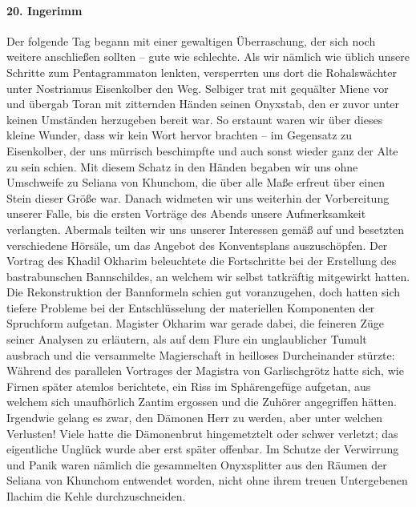 \paragraph{20. Ingerimm}
Der folgende Tag begann mit einer gewaltigen Überraschung, der sich noch weitere anschließen sollten -- gute wie schlechte. Als wir nämlich wie üblich unsere Schritte zum Pentagrammaton lenkten, versperrten uns dort die Rohalswächter unter Nostriamus Eisenkolber den Weg. Selbiger trat mit gequälter Miene vor und übergab Toran mit zitternden Händen seinen Onyxstab, den er zuvor unter keinen Umständen herzugeben bereit war. So erstaunt waren wir über dieses kleine Wunder, dass wir kein Wort hervor brachten -- im Gegensatz zu Eisenkolber, der uns mürrisch beschimpfte und auch sonst wieder ganz der Alte zu sein schien. Mit diesem Schatz in den Händen begaben wir uns ohne Umschweife zu Seliana von Khunchom, die über alle Maße erfreut über einen Stein dieser Größe war. Danach widmeten wir uns weiterhin der Vorbereitung unserer Falle, bis die ersten Vorträge des Abends unsere Aufmerksamkeit verlangten. Abermals teilten wir uns unserer Interessen gemäß auf und besetzten verschiedene Hörsäle, um das Angebot des Konventsplans auszuschöpfen. Der Vortrag des Khadil Okharim beleuchtete die Fortschritte bei der Erstellung des bastrabunschen Bannschildes, an welchem wir selbst tatkräftig mitgewirkt hatten. Die Rekonstruktion der Bannformeln schien gut voranzugehen, doch hatten sich tiefere Probleme bei der Entschlüsselung der materiellen Komponenten der Spruchform aufgetan. Magister Okharim war gerade dabei, die feineren Züge seiner Analysen zu erläutern, als auf dem Flure ein unglaublicher Tumult ausbrach und die versammelte Magierschaft in heilloses Durcheinander stürzte: Während des parallelen Vortrages der Magistra von Garlischgrötz hatte sich, wie Firnen später atemlos berichtete, ein Riss im Sphärengefüge aufgetan, aus welchem sich unaufhörlich Zantim ergossen und die Zuhörer angegriffen hätten. Irgendwie gelang es zwar, den Dämonen Herr zu werden, aber unter welchen Verlusten! Viele hatte die Dämonenbrut hingemetztelt oder schwer verletzt; das eigentliche Unglück wurde aber erst später offenbar. Im Schutze der Verwirrung und Panik waren nämlich die gesammelten Onyxsplitter aus den Räumen der Seliana von Khunchom entwendet worden, nicht ohne ihrem treuen Untergebenen Ilachim die Kehle durchzuschneiden.

